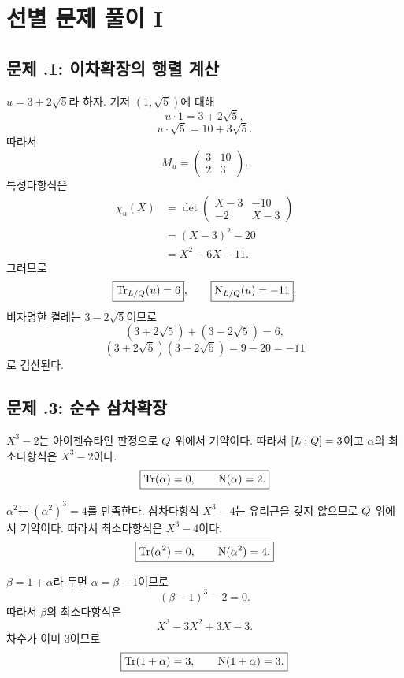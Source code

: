 \clearpage
\section{선별 문제 풀이 I}
\label{sec:norm-trace-solutions-a}

\subsection*{문제 \thechapter.1: 이차확장의 행렬 계산}

\begin{solution}
$u=3+2\sqrt5$라 하자. 기저 $(1,\sqrt5)$에 대해
\[
  u\cdot1=3+2\sqrt5,
\]
\[
  u\cdot\sqrt5=10+3\sqrt5.
\]
따라서
\[
  M_u=
  \begin{pmatrix}
    3&10\\
    2&3
  \end{pmatrix}.
\]
특성다항식은
\[
\begin{aligned}
  \chi_u(X)
  &=\det
  \begin{pmatrix}
    X-3&-10\\
    -2&X-3
  \end{pmatrix}\\
  &=(X-3)^2-20\\
  &=X^2-6X-11.
\end{aligned}
\]
그러므로
\[
  \boxed{\operatorname{Tr}_{L/Q}(u)=6},
  \qquad
  \boxed{\operatorname{N}_{L/Q}(u)=-11}.
\]
비자명한 켤레는 $3-2\sqrt5$이므로
\[
  (3+2\sqrt5)+(3-2\sqrt5)=6,
\]
\[
  (3+2\sqrt5)(3-2\sqrt5)=9-20=-11
\]
로 검산된다.
\end{solution}

\subsection*{문제 \thechapter.3: 순수 삼차확장}

\begin{solution}
$X^3-2$는 아이젠슈타인 판정으로 $Q$ 위에서 기약이다.
따라서 $[L:Q]=3$이고 $\alpha$의 최소다항식은 $X^3-2$이다.
\[
  \boxed{\operatorname{Tr}(\alpha)=0,\qquad \operatorname{N}(\alpha)=2.}
\]

$\alpha^2$는 $(\alpha^2)^3=4$를 만족한다. 삼차다항식 $X^3-4$는
유리근을 갖지 않으므로 $Q$ 위에서 기약이다. 따라서 최소다항식은 $X^3-4$이다.
\[
  \boxed{\operatorname{Tr}(\alpha^2)=0,\qquad \operatorname{N}(\alpha^2)=4.}
\]

$\beta=1+\alpha$라 두면 $\alpha=\beta-1$이므로
\[
  (\beta-1)^3-2=0.
\]
따라서 $\beta$의 최소다항식은
\[
  X^3-3X^2+3X-3.
\]
차수가 이미 $3$이므로
\[
  \boxed{\operatorname{Tr}(1+\alpha)=3,\qquad \operatorname{N}(1+\alpha)=3.}
\]
\end{solution}

